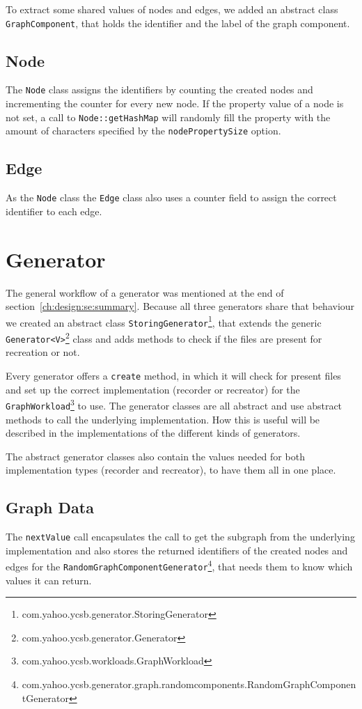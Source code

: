 To extract some shared values of nodes and edges,
we added an abstract class \texttt{GraphComponent},
that holds the identifier and the label of the graph component.

\subsection{Node}
The \texttt{Node} class assigns the identifiers by counting the created nodes and incrementing the counter for every new node.
If the property value of a node is not set,
a call to \texttt{Node::getHashMap} will randomly fill the property with the amount of characters specified by the \texttt{nodePropertySize} option.

\subsection{Edge}
As the \texttt{Node} class the \texttt{Edge} class also uses a counter field to assign the correct identifier to each edge.

\section{Generator}
\label{ch:implementation:se:generator}
The general workflow of a generator was mentioned at the end of section~\ref{ch:design:se:summary}.
Because all three generators share that behaviour we created an abstract class \texttt{StoringGenerator}\footnote{com.yahoo.ycsb.generator.StoringGenerator},
that extends the generic \texttt{Generator<V>}\footnote{com.yahoo.ycsb.generator.Generator} class and adds methods to check if the files are present for recreation or not.

Every generator offers a \texttt{create} method,
in which it will check for present files and set up the correct implementation (recorder or recreator) for the \texttt{GraphWorkload}\footnote{com.yahoo.ycsb.workloads.GraphWorkload} to use.
The generator classes are all abstract and use abstract methods to call the underlying implementation.
How this is useful will be described in the implementations of the different kinds of generators.

The abstract generator classes also contain the values needed for both implementation types (recorder and recreator),
to have them all in one place.

\subsection{Graph Data}
The \texttt{nextValue} call encapsulates the call to get the subgraph from the underlying implementation and also stores the returned identifiers of the created nodes and edges for the \texttt{RandomGraphComponentGenerator}\footnote{com.yahoo.ycsb.generator.graph.randomcomponents.RandomGraphComponentGenerator},
that needs them to know which values it can return.

